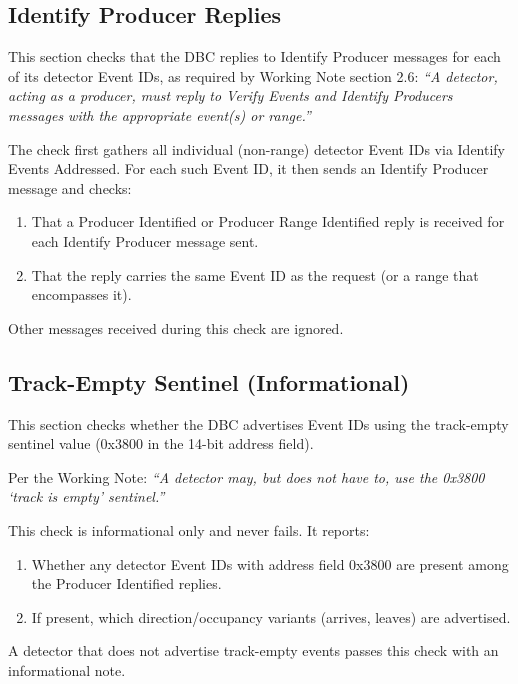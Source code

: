\subsection{Identify Producer Replies}

This section checks that the DBC replies to Identify Producer messages
for each of its detector Event IDs, as required by Working Note section 2.6:
\textit{``A detector, acting as a producer, must reply to Verify Events
and Identify Producers messages with the appropriate event(s) or range.''}

The check first gathers all individual (non-range) detector Event IDs
via Identify Events Addressed.  For each such Event ID, it then sends
an Identify Producer message and checks:

\begin{enumerate}
\item That a Producer Identified or Producer Range Identified reply is
    received for each Identify Producer message sent.
\item That the reply carries the same Event ID as the request (or a range
    that encompasses it).
\end{enumerate}

Other messages received during this check are ignored.

\subsection{Track-Empty Sentinel (Informational)}

This section checks whether the DBC advertises Event IDs using the
track-empty sentinel value (0x3800 in the 14-bit address field).

Per the Working Note:
\textit{``A detector may, but does not have to, use the 0x3800
`track is empty' sentinel.''}

This check is informational only and never fails.  It reports:

\begin{enumerate}
\item Whether any detector Event IDs with address field 0x3800 are
    present among the Producer Identified replies.
\item If present, which direction/occupancy variants (arrives, leaves)
    are advertised.
\end{enumerate}

A detector that does not advertise track-empty events passes this check
with an informational note.


